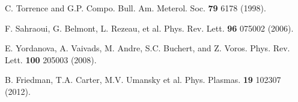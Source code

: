 \documentclass[aps,prx,twocolumn,secnumarabic,nobalancelastpage,amsmath,amssymb,
nofootinbib]{revtex4-1}
\begin{document}
\begin{thebibliography}{99}
C. Torrence and G.P. Compo. Bull. Am. Meterol. Soc. {\bf 79} 6178 (1998).

F. Sahraoui, G. Belmont, L. Rezeau, et al. Phys. Rev. Lett. {\bf 96} 075002 (2006).

E. Yordanova, A. Vaivads, M. Andre, S.C. Buchert, and Z. Voros. Phys. Rev. Lett. {\bf 100} 205003 (2008).

B. Friedman, T.A. Carter, M.V. Umansky et al. Phys. Plasmas. {\bf 19} 102307 (2012).

\end{thebibliography}
\end{document}
